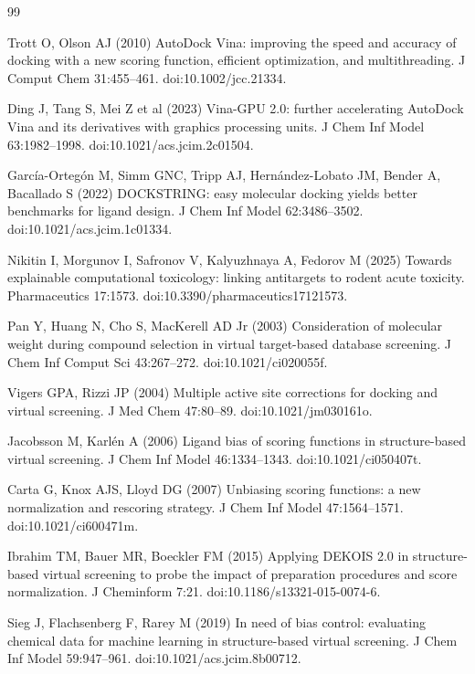 \documentclass[11pt]{article}
\begin{document}
\begin{thebibliography}{99}
\small

 Trott O, Olson AJ (2010) AutoDock Vina: improving the speed and
accuracy of docking with a new scoring function, efficient optimization, and
multithreading. J Comput Chem 31:455--461. doi:10.1002/jcc.21334.

 Ding J, Tang S, Mei Z et al (2023) Vina-GPU 2.0: further accelerating
AutoDock Vina and its derivatives with graphics processing units. J Chem Inf Model
63:1982--1998. doi:10.1021/acs.jcim.2c01504.

 Garc\'ia-Orteg\'on M, Simm GNC, Tripp AJ,
Hern\'andez-Lobato JM, Bender A, Bacallado S (2022) DOCKSTRING: easy molecular docking
yields better benchmarks for ligand design. J Chem Inf Model 62:3486--3502.
doi:10.1021/acs.jcim.1c01334.

 Nikitin I, Morgunov I, Safronov V, Kalyuzhnaya A, Fedorov M
(2025) Towards explainable computational toxicology: linking antitargets to rodent acute
toxicity. Pharmaceutics 17:1573. doi:10.3390/pharmaceutics17121573.

 Pan Y, Huang N, Cho S, MacKerell AD Jr (2003) Consideration of
molecular weight during compound selection in virtual target-based database screening.
J Chem Inf Comput Sci 43:267--272. doi:10.1021/ci020055f.

 Vigers GPA, Rizzi JP (2004) Multiple active site corrections for
docking and virtual screening. J Med Chem 47:80--89. doi:10.1021/jm030161o.

 Jacobsson M, Karl\'en A (2006) Ligand bias of scoring functions in
structure-based virtual screening. J Chem Inf Model 46:1334--1343.
doi:10.1021/ci050407t.

 Carta G, Knox AJS, Lloyd DG (2007) Unbiasing scoring functions: a new
normalization and rescoring strategy. J Chem Inf Model 47:1564--1571.
doi:10.1021/ci600471m.

 Ibrahim TM, Bauer MR, Boeckler FM (2015) Applying DEKOIS 2.0 in
structure-based virtual screening to probe the impact of preparation procedures and score
normalization. J Cheminform 7:21. doi:10.1186/s13321-015-0074-6.

 Sieg J, Flachsenberg F, Rarey M (2019) In need of bias control:
evaluating chemical data for machine learning in structure-based virtual screening.
J Chem Inf Model 59:947--961. doi:10.1021/acs.jcim.8b00712.


\end{thebibliography}
\end{document}
